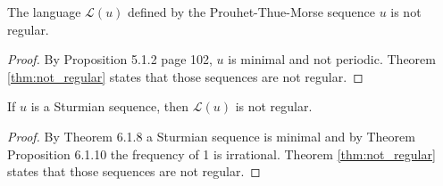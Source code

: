 \documentclass{article}
\begin{document}
\begin{corollary} \label{cor:ptm_not_regular}
The language $\mathcal{L}(u)$ defined by the Prouhet-Thue-Morse sequence $u$ is
not regular.
\end{corollary}

\begin{proof} 
By Proposition 5.1.2 \cite{Fogg} page 102, $u$ is minimal and not periodic.
Theorem \ref{thm:not_regular} states that those sequences are not regular.
\end{proof}

\begin{corollary} \label{cor:sturmian_not_regular}
If $u$ is a Sturmian sequence, then $\mathcal{L}(u)$ is not regular.
\end{corollary}

\begin{proof} 
By Theorem 6.1.8 \cite{Fogg} a Sturmian sequence is minimal and by Theorem 
Proposition 6.1.10 \cite{Fogg} the frequency of 1 is irrational. Theorem 
\ref{thm:not_regular} states that those sequences are not regular.
\end{proof}
\end{document}
